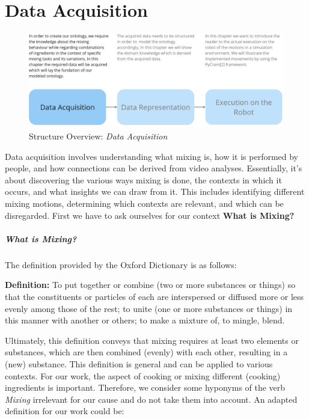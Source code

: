 \chapter{Data Acquisition}
\label{chap:Data_acquisition}
\begin{figure}[H]
  \includegraphics[scale=0.25]{Graphics/structure_overview1.jpg}
  \caption{Structure Overview: \textit{Data Acquisition}}
\end{figure}
Data acquisition involves understanding what mixing is, how it is performed by people, and how connections can be derived from video analyses. Essentially, it’s about discovering the various ways mixing is done, the contexts in which it occurs, and what insights we can draw from it. This includes identifying different mixing motions, determining which contexts are relevant, and which can be disregarded.
First we have to ask ourselves for our context \textbf{What is Mixing?}
\paragraph*{What is Mixing?}
  The definition provided by the Oxford Dictionary \cite{Oxford} is as follows:
  
  \textbf{Definition:} To put together or combine (two or more substances or things) so that the constituents or particles of each are interspersed or diffused more or less evenly among those of the rest; to unite (one or more substances or things) in this manner with another or others; to make a mixture of, to mingle, blend.

  Ultimately, this definition conveys that mixing requires at least two elements or substances, which are then combined (evenly) with each other, resulting in a (new) substance.
  This definition is general and can be applied to various contexts. For our work, the aspect of cooking or mixing different (cooking) ingredients is important. Therefore, we consider some hyponyms of the verb \textit{Mixing} irrelevant for our cause and do not take them into account.
  An adapted definition for our work could be: 
  
